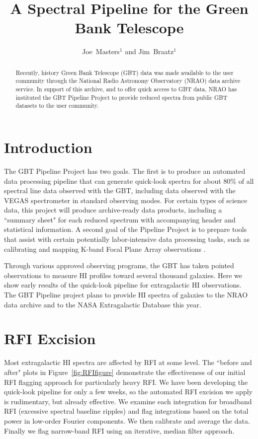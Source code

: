 \documentclass[11pt,twoside]{article}
\begin{document}
\title{A Spectral Pipeline for the Green Bank Telescope}
\author{Joe~Masters$^1$ and Jim~Braatz$^1$
}

\begin{abstract}
Recently, history Green Bank Telescope (GBT) data was made available to the user community through the National Radio Astronomy Observatory (NRAO) data archive service.  In support of this archive, and to offer quick access to GBT data, NRAO has instituted the GBT Pipeline Project to provide reduced spectra from public GBT datasets to the user community.
\end{abstract}

\section{Introduction}

The GBT Pipeline Project has two goals. The first is to produce an automated data processing pipeline that can generate quick-look spectra for about 80\% of all spectral line data observed with the GBT, including data observed with the VEGAS spectrometer \citep{2012arXiv1202.0938A} in standard observing modes. For certain types of science data, this project will produce archive-ready data products, including a ``summary sheet" for each reduced spectrum with accompanying header and statistical information. A second goal of the Pipeline Project is to prepare tools that assist with certain potentially labor-intensive data processing tasks, such as calibrating and mapping K-band Focal Plane Array observations \citep[see][]{2011ASPC..442..127M}.

Through various approved observing programs, the GBT has taken pointed observations to measure HI profiles toward several thousand galaxies. Here we show early results of the quick-look pipeline for extragalactic HI observations. The GBT Pipeline project plans to provide HI spectra of galaxies to the NRAO data archive and to the NASA Extragalactic Database this year.

\section{RFI Excision}

Most extragalactic HI spectra are affected by RFI at some level.  The ``before and after" plots in Figure~\ref{fig:RFIfigure} demonstrate the effectiveness of our initial RFI flagging approach for particularly heavy RFI.  We have been developing the quick-look pipeline for only a few weeks, so the automated RFI excision we apply is rudimentary, but already effective. We examine each integration for broadband RFI (excessive spectral baseline ripples) and flag integrations based on the total power in low-order Fourier components. We then calibrate and average the data. Finally we flag narrow-band RFI using an iterative, median filter approach.
\end{document}
